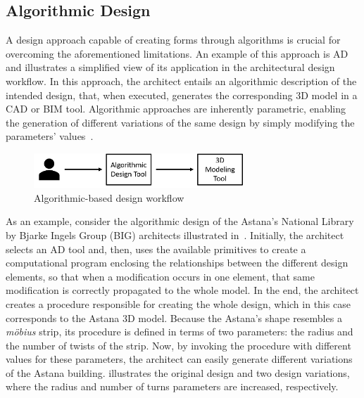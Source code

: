\subsection{Algorithmic Design}

	A design approach capable of creating forms through algorithms is crucial for overcoming the aforementioned limitations. An example of this approach is \ac{AD}~\cite{Branco2017AD} and  illustrates a simplified view of its application in the architectural design workflow. In this approach, the architect entails an algorithmic description of the intended design, that, when executed, generates the corresponding 3D model in a \ac{CAD} or \ac{BIM} tool. Algorithmic approaches are inherently parametric, enabling the generation of different variations of the same design by simply modifying the parameters' values~\cite{Leitao2014GD}. 
	
\begin{figure}[htbp]
\centering
\includegraphics[width=0.70\textwidth]{./Images/Introduction/AlgorithmicArchitecturalDesign.png}
\caption[General view of the Algorithmic Design Approach]{Algorithmic-based design workflow}
\label{fig:algorithmicdesign}
\end{figure}
	
	As an example, consider the algorithmic design of the Astana's National Library by Bjarke Ingels Group (BIG) architects illustrated in~. Initially, the architect selects an \ac{AD} tool and, then, uses the available primitives to create a computational program enclosing the relationships between the different design elements, so that when a modification occurs in one element, that same modification is correctly propagated to the whole model. In the end, the architect creates a procedure responsible for creating the whole design, which in this case corresponds to the Astana 3D model. Because the Astana's shape resembles a \textit{möbius} strip, its procedure is defined in terms of two parameters: the radius and the number of twists of the strip. Now, by invoking the procedure with different values for these parameters, the architect can easily generate different variations of the Astana building.  illustrates the original design and two design variations, where the radius and number of turns parameters are increased, respectively. 
	
